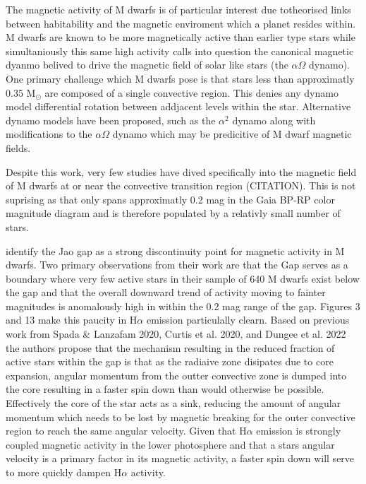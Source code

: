 The magnetic activity of M dwarfs is of particular interest due totheorised links between habitability and the magnetic enviroment which a planet resides within. M dwarfs are known to be more magnetically active than earlier type stars while simultaniously this same high activity calls into question the canonical magnetic dyanmo belived to drive the magnetic field of solar like stars (the $\alpha\Omega$ dynamo). One primary challenge which M dwarfs pose is that stars less than approximatly 0.35 M$_{\odot}$ are composed of a single convective region. This denies any dynamo model differential rotation between addjacent levels within the star. Alternative dynamo models have been proposed, such as the $\alpha^{2}$ dynamo along with modifications to the $\alpha\Omega$ dynamo which may be predicitive of M dwarf magnetic fields.

Despite this work, very few studies have dived specifically into the magnetic field of M dwarfs at or near the convective transition region {\color{red}(CITATION)}. This is not suprising as that only spans approximatly 0.2 mag in the Gaia BP-RP color magnitude diagram and is therefore populated by a relativly small number of stars. 

\citep{Jao2023} identify the Jao gap as a strong discontinuity point for
magnetic activity in M dwarfs. Two primary observations from their work are
that the Gap serves as a boundary where very few active stars in their sample
of 640 M dwarfs exist below the gap and that the overall downward trend of
activity moving to fainter magnitudes is anomalously high in within the 0.2 mag
range of the gap. \citeauthor{Jao2023} Figures 3 and 13 make this paucity in
H$\alpha$ emission particulally clearn. Based on previous work from
{\color{red}Spada \& Lanzafam 2020}, {\color{red}Curtis et al. 2020, and Dungee
et al. 2022} the authors propose that the mechanism resulting in the reduced
fraction of active stars within the gap is that as the radiaive zone disipates
due to core expansion, angular momentum from the outter convective zone is
dumped into the core resulting in a faster spin down than would otherwise be
possible. Effectively the core of the star acts as a sink, reducing the amount
of angular momentum which needs to be lost by magnetic breaking for the outer
convective region to reach the same angular velocity. Given that H$\alpha$
emission is strongly coupled magnetic activity in the lower photosphere and
that a stars angular velocity is a primary factor in its magnetic activity, a
faster spin down will serve to more quickly dampen H$\alpha$ activity.

